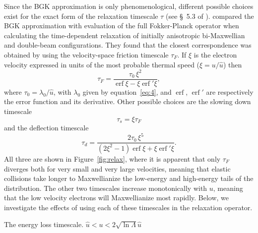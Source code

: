 \documentclass{emulateapj}
\newcommand\ubar{\ensuremath{\hat{u}}}
\begin{document}
Since the BGK approximation is only phenomenological, different
possible choices exist for the exact form of the relaxation timescale
\(\tau\)
(see \S~5.3 of \citealp{Spitzer:1956a}).  \citet{Livi:1986a} compared the
BGK approximation with evaluation of the full Fokker-Planck operator
when calculating the time-dependent relaxation of initially
anisotropic bi-Maxwellian and double-beam configurations.  They found
that the closest correspondence was obtained by using the
velocity-space friction timescale \(\tau_{F}\).  If \(\xi\)
is the electron velocity expressed in units of the most probable thermal speed
(\(\xi = u /\ubar\)) then \newcommand\erf{\operatorname{erf}}
\begin{equation}
  \label{eq:3}
  \tau_{F} = \frac{\tau_0 \, \xi^2}{\erf\xi - \xi\erf'\!\xi}, 
\end{equation}
where \(\tau_0 = \lambda_0 / \ubar\), with \(\lambda_0\) given by
equation~\eqref{eq:4}, and \(\erf\), \(\erf'\) are respectively the
error function and its derivative. Other possible
choices are the slowing down timescale
\begin{equation}
  \label{eq:9}
  \tau_{s} = \xi \tau_{F} 
\end{equation}
and the deflection timescale 
\begin{equation}
  \label{eq:10}
  \tau_{d} = \frac{2 \tau_0 \, \xi^5}{(2\xi^2 - 1)\erf\xi + \xi\erf'\!\xi} .  
\end{equation}
All three are shown in Figure~\ref{fig:relax}, where it is apparent
that only \(\tau_F\)
diverges both for very small and very large velocities, meaning that
elastic collisions take longer to Maxwellianize the low-energy and
high-energy tails of the distribution.  The other two timescales
increase monotonically with \(u\),
meaning that the low velocity electrons will Maxwellianize most
rapidly.  Below, we investigate the effects of using each of these
timescales in the relaxation operator.

The energy loss timescale. \(\ubar < u < 2 \sqrt{\ln\Lambda} \ubar\)

\newcommand*{\vcenteredhbox}[1]{\begingroup
  \setbox0=\hbox{#1}\parbox{\wd0}{\box0}\endgroup}
\end{document}
